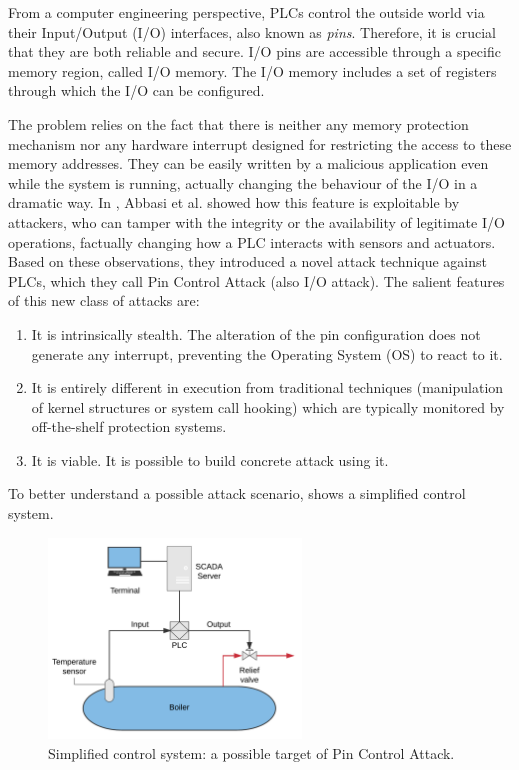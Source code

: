 From a computer engineering perspective, PLCs control the outside world via their Input/Output (I/O) interfaces, also known as \emph{pins}.
Therefore, it is crucial that they are both reliable and secure. I/O pins are accessible through a specific memory region, called I/O memory.
The I/O memory includes a set of registers through which the I/O can be configured.

The problem relies on the fact that there is neither any memory protection mechanism nor any hardware interrupt designed for restricting the access to these memory addresses.
They can be easily written by a malicious application even while the system is running, actually changing the behaviour of the I/O in a dramatic way.
In \cite{ghostplc}, Abbasi et al. showed how this feature is exploitable by attackers, who can tamper with
the integrity or the availability of legitimate I/O operations, factually changing how a PLC interacts with sensors and actuators.
Based on these observations, they introduced a novel attack technique against PLCs, which they call Pin Control Attack (also I/O attack).
The salient features of this new class of attacks are:
\begin{enumerate}[itemsep=2pt,topsep=0pt]
	\item It is intrinsically stealth. The alteration of the pin configuration does not generate any interrupt, preventing the Operating System (OS) to react to it.
	\item It is entirely different in execution from traditional techniques (\eg manipulation of kernel structures or system call hooking) which are typically
		monitored by off-the-shelf protection systems.
	\item It is viable. It is possible to build concrete attack using it.
\end{enumerate}

To better understand a possible attack scenario, \myfig{\ref{fig:control}} shows a simplified control system.
\begin{figure}[h!]
\centerline{\includegraphics[width=0.6\textwidth]{res/control}}
\caption{Simplified control system: a possible target of Pin Control Attack.\label{fig:control}}
\end{figure}

